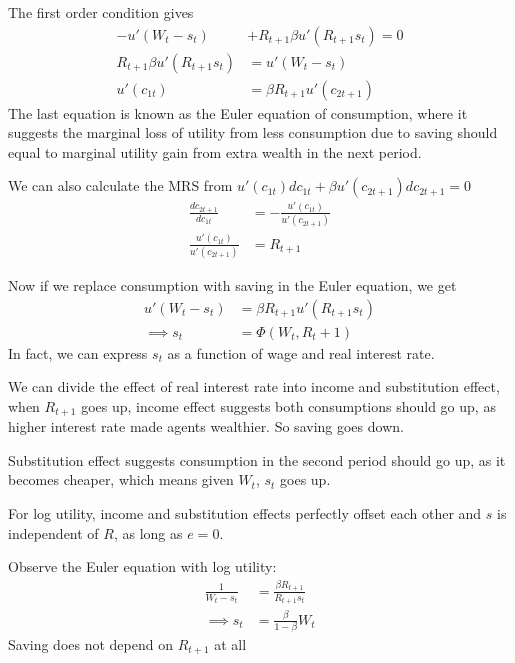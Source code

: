 \documentclass[twocolumn, fleqn]{article}
\begin{document}
				The first order condition gives
				\begin{align*}
					-u'(W_t - s_t)&+R_{t+1}\beta u'(R_{t+1}s_t)=0\\
					R_{t+1}\beta u'(R_{t+1}s_t)&= u'(W_t - s_t)\\
					u'(c_{1t})&= \beta R_{t+1}u'(c_{2t+1})\tag{Euler Equation}
				\end{align*}
				The last equation is known as the Euler equation of consumption, where it suggests the marginal loss
				of utility from less consumption due to saving should equal to marginal utility gain from extra
				wealth in the next period.

				We can also calculate the MRS from $u'(c_{1t})dc_{1t}+\beta u'(c_{2t+1})dc_{2t+1}=0$
				\begin{align*}
					\frac{dc_{2t+1}}{dc_{1t}} &= -\frac{u'(c_{1t})}{u'(c_{2t+1})}\\
					\frac{u'(c_{1t})}{u'(c_{2t+1})} &= R_{t+1}
				\end{align*}

	
				Now if we replace consumption with saving in the Euler equation, we get
				\begin{align*}
					u'(W_t - s_t) &= \beta R_{t+1}u'(R_{t+1}s_t)\\
					\implies s_t &= \Phi(W_t, R_t+1)
				\end{align*}
				In fact, we can express $s_t$ as a function of wage and real interest rate.

				\begin{note}
					We can divide the effect of real interest rate into income and substitution effect, when $R_{t+1}$ goes up, income effect suggests both consumptions should go up, as higher interest rate made agents wealthier.
					So saving goes down.

					Substitution effect suggests consumption in the second period should go up, as it becomes
					cheaper, which means given $W_t$, $s_t$ goes up.

					For log utility, income and substitution effects perfectly offset each other and $s$ is
					independent of $R$, as long as $e=0$.

					Observe the Euler equation with log utility:
					\begin{align*}
						\frac{1}{W_t - s_t} &= \frac{\beta R_{t+1}}{R_{t+1}s_t}\\
						\implies s_t &= \frac{\beta}{1-\beta}W_t
					\end{align*}
					Saving does not depend on $R_{t+1}$ at all
				\end{note}
\end{document}
